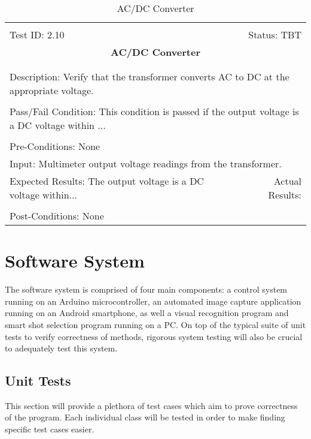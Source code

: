 \documentclass[titlepage]{article}
\begin{document}
\begin{center}%
\begin{table}
\begin{tabular}{|l r|}\hline&\\[-2mm]
	Test ID: 2.10	&Status: TBT\\[-3mm]
	\multicolumn{2}{|c|}{\textbf{\large{AC/DC Converter}}}\\&\\\hline&\\[-3mm]
	\multicolumn{2}{|p{\textwidth}|}{Description: Verify that the transformer converts AC to DC at the appropriate voltage.}\\[1mm]\hline&\\[-3mm]
	\multicolumn{2}{|p{\textwidth}|}{Pass/Fail Condition: This condition is passed if the output voltage is a DC voltage within ...}\\[1mm]\hline&\\[-3mm]%
	\multicolumn{2}{|p{\textwidth}|}{Pre-Conditions: None}\\[4mm]
	\multicolumn{2}{|p{\textwidth}|}{Input: Multimeter output voltage readings from the transformer.}\\[2mm]\hline
	\multicolumn{1}{|p{0.49\textwidth}}{Expected Results: The output voltage is a DC voltage within...}	&\multicolumn{1}{|p{0.45\textwidth}|}{Actual Results:}\\\hline&\\[-3mm]%
	\multicolumn{2}{|p{\textwidth}|}{Post-Conditions: None}\\\hline
\end{tabular}
\caption{AC/DC Converter}
\end{table}
\end{center}


\section{Software System}
The software system is comprised of four main components: a control system running on an Arduino microcontroller, an automated image capture application running on an Android smartphone, as well a visual recognition program and smart shot selection program running on a PC. On top of the typical suite of unit tests to verify correctness of methods, rigorous system testing will also be crucial to adequately test this system.

\subsection{Unit Tests}%
This section will provide a plethora of test cases which aim to prove correctness of the program. Each individual class will be tested in order to make finding specific test cases easier.
\end{document}
